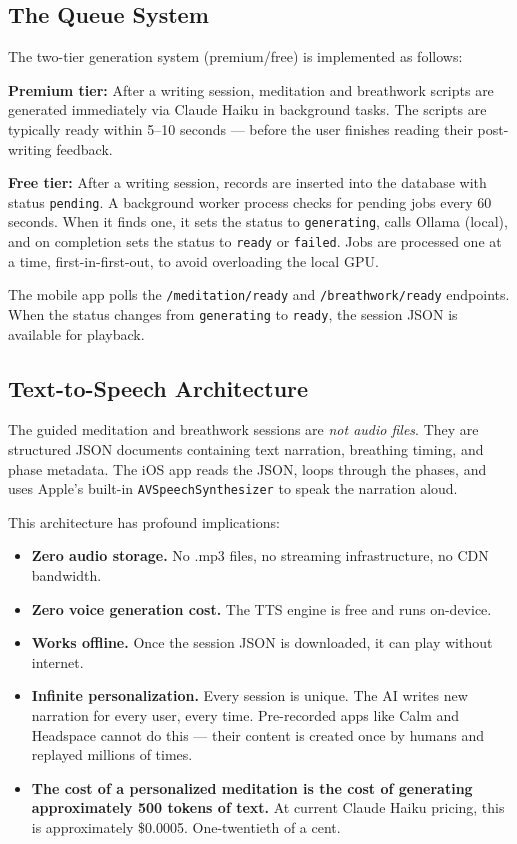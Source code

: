 \documentclass[12pt, a4paper]{article}
\begin{document}
\subsection{The Queue System}

The two-tier generation system (premium/free) is implemented as follows:

\textbf{Premium tier:} After a writing session, meditation and breathwork scripts are generated immediately via Claude Haiku in background tasks. The scripts are typically ready within 5--10 seconds --- before the user finishes reading their post-writing feedback.

\textbf{Free tier:} After a writing session, records are inserted into the database with status \texttt{pending}. A background worker process checks for pending jobs every 60 seconds. When it finds one, it sets the status to \texttt{generating}, calls Ollama (local), and on completion sets the status to \texttt{ready} or \texttt{failed}. Jobs are processed one at a time, first-in-first-out, to avoid overloading the local GPU.

The mobile app polls the \texttt{/meditation/ready} and \texttt{/breathwork/ready} endpoints. When the status changes from \texttt{generating} to \texttt{ready}, the session JSON is available for playback.

\subsection{Text-to-Speech Architecture}

The guided meditation and breathwork sessions are \textit{not audio files}. They are structured JSON documents containing text narration, breathing timing, and phase metadata. The iOS app reads the JSON, loops through the phases, and uses Apple's built-in \texttt{AVSpeechSynthesizer} to speak the narration aloud.

This architecture has profound implications:

\begin{itemize}[leftmargin=2cm]
    \item \textbf{Zero audio storage.} No .mp3 files, no streaming infrastructure, no CDN bandwidth.
    \item \textbf{Zero voice generation cost.} The TTS engine is free and runs on-device.
    \item \textbf{Works offline.} Once the session JSON is downloaded, it can play without internet.
    \item \textbf{Infinite personalization.} Every session is unique. The AI writes new narration for every user, every time. Pre-recorded apps like Calm and Headspace cannot do this --- their content is created once by humans and replayed millions of times.
    \item \textbf{The cost of a personalized meditation is the cost of generating approximately 500 tokens of text.} At current Claude Haiku pricing, this is approximately \$0.0005. One-twentieth of a cent.
\end{itemize}
\end{document}
